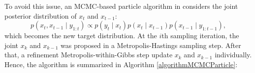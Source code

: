 To avoid this issue, an MCMC-based particle algorithm in \citep{pang2008models} considers the joint posterior distribution of $x_t$ and $x_{t-1}$:
\begin{equation}\label{mcmcbasedposterior}
p(x_t,x_{t-1}\mid y_{1:t})\propto p(y_t\mid x_t)p(x_t\mid x_{t-1})p(x_{t-1}\mid y_{1:t-1}),
\end{equation}
which becomes the new target distribution. At the $i$th sampling iteration, the joint $x_k$ and $x_{k-1}$ was proposed in a Metropolis-Hastings sampling step. After that, a refinement Metropolis-within-Gibbs step update $x_k$ and $x_{k-1}$ individually. Hence, the algorithm is summarized in Algorithm \ref{algorithmMCMCParticle}:

